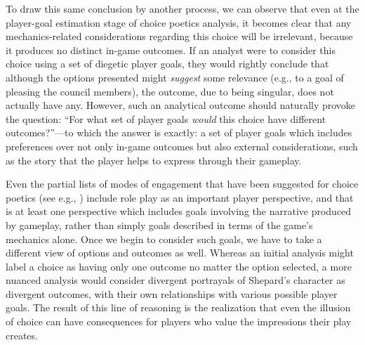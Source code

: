 \documentclass[arts,article,submit,moreauthors,pdftex,10pt,a4paper]{Definitions/mdpi}
\begin{document}
To draw this same conclusion by another process, we can observe that even at the player-goal estimation stage of choice poetics analysis, it becomes clear that any mechanics-related considerations regarding this choice will be irrelevant, because it produces no distinct in-game outcomes.
%
If an analyst were to consider this choice using a set of diegetic player goals, they would rightly conclude that although the options presented might \emph{suggest} some relevance (e.g., to a goal of pleasing the council members), the outcome, due to being singular, does not actually have any.
%
However, such an analytical outcome should naturally provoke the question: ``For what set of player goals \emph{would} this choice have different outcomes?''---to which the answer is exactly: a set of player goals which includes preferences over not only in-game outcomes but also external considerations, such as the story that the player helps to express through their gameplay.


Even the partial lists of modes of engagement that have been suggested for choice poetics (see e.g., \cite{mawhorter2014towards}) include role play as an important player perspective, and that is at least one perspective which includes goals involving the narrative produced by gameplay, rather than simply goals described in terms of the game's mechanics alone.
%
Once we begin to consider such goals, we have to take a different view of options and outcomes as well.
%
Whereas an initial analysis might label a choice as having only one outcome no matter the option selected, a more nuanced analysis would consider divergent portrayals of Shepard's character as divergent outcomes, with their own relationships with various possible player goals.
%
The result of this line of reasoning is the realization that even the illusion of choice can have consequences for players who value the impressions their play creates.
\end{document}
